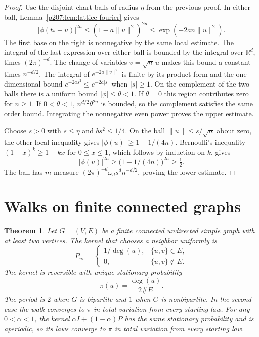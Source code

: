 \documentclass[11pt,oneside,openany]{book}
\theoremstyle{plain}
\newtheorem{theorem}{Theorem}[chapter]
\theoremstyle{definition}
\theoremstyle{remark}
\begin{document}
\begin{proof}
Use the disjoint chart balls of radius \(\eta\) from the previous
proof. In either ball, Lemma~\ref{p207:lem:lattice-fourier} gives
\[
 \lvert\phi(t_*+u)\rvert^{2n}
 \leq (1-a\lVert u\rVert^2)^{2n}
 \leq \exp(-2an\lVert u\rVert^2).
\]
The first base on the right is nonnegative by the same local estimate.
The integral of the last expression over either ball is bounded by
the integral over \(\mathbb R^d\), times \((2\pi)^{-d}\).
The change of variables \(v=\sqrt n\,u\) makes this bound a constant
times \(n^{-d/2}\). The integral of \(e^{-2a\lVert v\rVert^2}\) is
finite by its product form and the one-dimensional bound
\(e^{-2a s^2}\leq e^{-2a\lvert s\rvert}\) when \(\lvert s\rvert\geq1\).
On the complement of the two balls there is a uniform bound
\(\lvert\phi\rvert\leq\theta<1\). If \(\theta=0\) this region contributes
zero for \(n\geq1\). If \(0<\theta<1\), \(n^{d/2}\theta^{2n}\) is
bounded, so the complement satisfies the same order bound. Integrating
the nonnegative even power proves the upper estimate.

Choose \(s>0\) with \(s\leq\eta\) and \(b s^2\leq1/4\). On the ball
\(\lVert u\rVert\leq s/\sqrt n\) about zero, the other local inequality
gives \(\lvert\phi(u)\rvert\geq 1-1/(4n)\). Bernoulli's inequality
\((1-x)^k\geq1-kx\) for \(0\leq x\leq1\), which follows by induction
on \(k\), gives
\[
 \lvert\phi(u)\rvert^{2n}\geq \bigl(1-1/(4n)\bigr)^{2n}\geq \tfrac12 .
\]
The ball has \(m\)-measure
\((2\pi)^{-d}\omega_d s^d n^{-d/2}\), proving the lower estimate.
\end{proof}

\section{Walks on finite connected graphs}\label{p207:W24}

\begin{theorem}\label{p207:thm:graph-walk}
Let \(G=(V,E)\) be a finite connected undirected simple graph with
at least two vertices. The kernel that chooses a neighbor uniformly is
\[
 P_{uv}=
 \begin{cases}
  1/\deg(u), & \{u,v\}\in E,\\
  0, & \{u,v\}\notin E.
 \end{cases}
\]
The kernel is reversible with unique stationary probability
\[
 \pi(u)=\frac{\deg(u)}{2\#E}.
\]
The period is \(2\) when \(G\) is bipartite and \(1\) when \(G\) is
nonbipartite. In the second case the walk converges to \(\pi\) in
total variation from every starting law.
For any \(0<\alpha<1\), the kernel \(\alpha I+(1-\alpha)P\)
has the same stationary probability and is aperiodic, so its laws
converge to \(\pi\) in total variation from every starting law.
\end{theorem}
\end{document}
